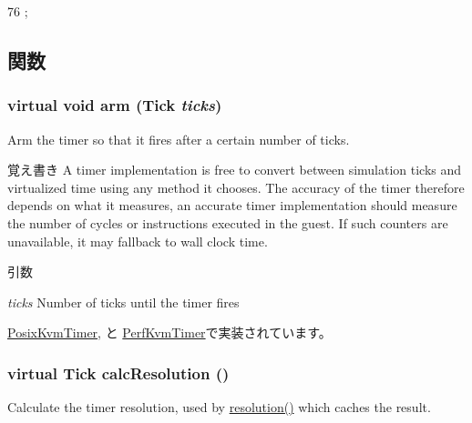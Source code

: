 \begin{DoxyCode}
76 {};
\end{DoxyCode}


\subsection{関数}
\hypertarget{classBaseKvmTimer_af6a92c8cd2abd0bf8699cbefe1257074}{
\subsubsection[{arm}]{\setlength{\rightskip}{0pt plus 5cm}virtual void arm ({\bf Tick} {\em ticks})}}
\label{classBaseKvmTimer_af6a92c8cd2abd0bf8699cbefe1257074}
Arm the timer so that it fires after a certain number of ticks.

\begin{DoxyNote}{覚え書き}
A timer implementation is free to convert between simulation ticks and virtualized time using any method it chooses. The accuracy of the timer therefore depends on what it measures, an accurate timer implementation should measure the number of cycles or instructions executed in the guest. If such counters are unavailable, it may fallback to wall clock time.
\end{DoxyNote}

\begin{DoxyParams}{引数}
\item[{\em ticks}]Number of ticks until the timer fires \end{DoxyParams}


\hyperlink{classPosixKvmTimer_a5041ff590d50fcb1f0f5149b2e7eb4bb}{PosixKvmTimer}, と \hyperlink{classPerfKvmTimer_a5041ff590d50fcb1f0f5149b2e7eb4bb}{PerfKvmTimer}で実装されています。\hypertarget{classBaseKvmTimer_a8bff362cf60f8a6adbdc0aa31cb9be27}{
\subsubsection[{calcResolution}]{\setlength{\rightskip}{0pt plus 5cm}virtual {\bf Tick} calcResolution ()}}
\label{classBaseKvmTimer_a8bff362cf60f8a6adbdc0aa31cb9be27}
Calculate the timer resolution, used by \hyperlink{classBaseKvmTimer_a4450cc644b16fe4cb8b25ed02fb6446f}{resolution()} which caches the result.

